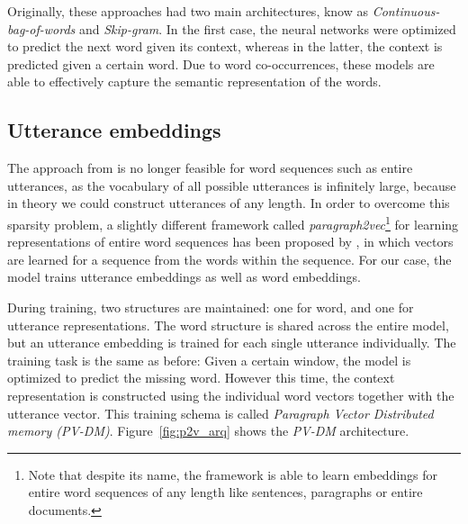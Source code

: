 Originally, these approaches had two main architectures, know as \emph{Continuous-bag-of-words} and \emph{Skip-gram}. In the first case, the neural networks were optimized to predict the next word given its context, whereas in the latter, the context is predicted given a certain word.
Due to word co-occurrences, these models are able to effectively capture the semantic representation of the words. 

\subsection{Utterance embeddings} 
The approach from  is no longer feasible for word sequences such as entire utterances, as the vocabulary of all possible utterances  is infinitely large, because in theory we could construct utterances of any length.
In order to overcome this sparsity problem, a slightly different framework called \emph{paragraph2vec}\footnote{Note that despite its name, the framework is able to learn embeddings for entire word sequences of any length like sentences, paragraphs or entire documents.} for learning representations of entire word sequences has been proposed by , in which vectors are learned for a sequence from the words within the sequence.
For our case, the model trains utterance embeddings as well as word embeddings.

During training, two structures are maintained: one for word, and one for utterance representations.
The word structure is shared across the entire model, but an utterance embedding is trained for each single utterance individually.
The training task is the same as before: Given a certain window, the model is optimized to predict the missing word.
However this time, the context representation is constructed using the individual word vectors together with the utterance vector.
This training schema is called \emph{Paragraph Vector Distributed memory (PV-DM)}.  Figure~\ref{fig:p2v_arq} shows the \emph{PV-DM} architecture.



